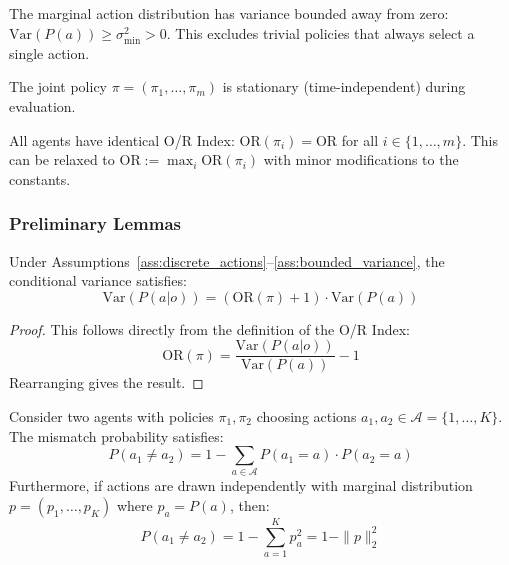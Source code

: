 \begin{assumption}
\label{ass:bounded_variance}
The marginal action distribution has variance bounded away from zero: $\text{Var}(P(a)) \geq \sigma^2_{\min} > 0$. This excludes trivial policies that always select a single action.
\end{assumption}

\begin{assumption}
\label{ass:stationary}
The joint policy $\pi = (\pi_1, \ldots, \pi_m)$ is stationary (time-independent) during evaluation.
\end{assumption}

\begin{assumption}
\label{ass:symmetric_or}
All agents have identical O/R Index: $\text{OR}(\pi_i) = \text{OR}$ for all $i \in \{1, \ldots, m\}$. This can be relaxed to $\text{OR} := \max_i \text{OR}(\pi_i)$ with minor modifications to the constants.
\end{assumption}

\subsubsection{Preliminary Lemmas}

\begin{lemma}
\label{lem:variance_decomp}
Under Assumptions~\ref{ass:discrete_actions}--\ref{ass:bounded_variance}, the conditional variance satisfies:
\begin{equation}
\text{Var}(P(a|o)) = (\text{OR}(\pi) + 1) \cdot \text{Var}(P(a))
\end{equation}
\end{lemma}

\begin{proof}
This follows directly from the definition of the O/R Index:
\begin{equation}
\text{OR}(\pi) = \frac{\text{Var}(P(a|o))}{\text{Var}(P(a))} - 1
\end{equation}
Rearranging gives the result.
\end{proof}

\begin{lemma}
\label{lem:mismatch_two}
Consider two agents with policies $\pi_1, \pi_2$ choosing actions $a_1, a_2 \in \mathcal{A} = \{1, \ldots, K\}$. The mismatch probability satisfies:
\begin{equation}
P(a_1 \neq a_2) = 1 - \sum_{a \in \mathcal{A}} P(a_1 = a) \cdot P(a_2 = a)
\end{equation}
Furthermore, if actions are drawn independently with marginal distribution $p = (p_1, \ldots, p_K)$ where $p_a = P(a)$, then:
\begin{equation}
P(a_1 \neq a_2) = 1 - \sum_{a=1}^K p_a^2 = 1 - \|p\|_2^2
\end{equation}
\end{lemma}

